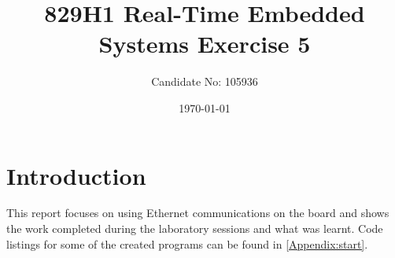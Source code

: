 \documentclass[a4paper,12pt]{scrartcl}
\title{829H1 Real-Time Embedded Systems Exercise 5}
\author{Candidate No: 105936}
\date{\today}
\begin{document}
	
	\begin{titlepage}
		\maketitle
	\end{titlepage}
	
	\tableofcontents
	\newpage
	
	\section{Introduction}
	{
		This report focuses on using Ethernet communications on the board and shows the work completed during the laboratory sessions and what was learnt. Code listings for some of the created programs can be found in \cref{Appendix:start}.
	}
	
\end{document}
